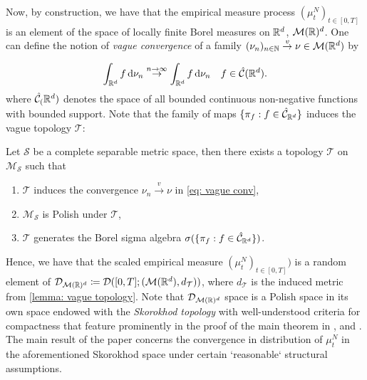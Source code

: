 \documentclass{article}
\begin{document}
Now, by construction, we have that the empirical measure process $ (\mu^{N}_{t})_{t\in [0,T]}$ is an element of the space of locally finite Borel measures on $ \mathbb{R}^{d}$, $ \mathcal{M}(\mathbb{R})^{d}$. One can define the notion of \textit{vague convergence} of a family $ (\nu_{n})_{n\in \mathbb{N}} \stackrel{v}{\to} \nu\in \mathcal{M}(\mathbb{R}^{d})$ by 

\begin{equation}\label{eq: vague conv}
	\int_{\mathbb{R}^{d}}f \operatorname{d}\! \nu_{n}\stackrel{n\to \infty}{\to} \int_{\mathbb{R}^{d}}f \operatorname{d}\! \nu_{n} \quad  f\in \hat{\mathcal{C}}(\mathbb{R}^{d}).
\end{equation}
where $ \hat{\mathcal{C}}_(\mathbb{R}^{d})$ denotes the space of all bounded continuous non-negative functions with bounded support. Note that the family of maps $\{\pi_{f}:f\in \hat {\mathcal{C}}_{\mathbb{R}^{d}}\} $ induces the vague topology $ \mathcal{T}$: 

\begin{boxlemma}\label{lemma: vague topology}
Let $  \mathcal{S}$ be a complete separable metric space, then there exists a topology $  \mathcal{T}$ on $  \mathcal{M}_{ \mathcal{ S}}$ such that
\begin{enumerate}
\item $ \mathcal{T}$ induces the convergence $ \nu_{n}\stackrel{v}{\longrightarrow}\nu$ in \ref{eq: vague conv},
\item $ \mathcal{M}_{ \mathcal{S}}$ is Polish under $  \mathcal{T}$,
\item $  \mathcal{T}$ generates the Borel sigma algebra $\sigma(\{\pi_{f}:f\in \hat {\mathcal{C}}_{\mathbb{R}^{d}}\})$.
\end{enumerate}

\end{boxlemma}

Hence, we have that the scaled empirical measure $ (\mu^{N}_{t})_{t\in [0,T]})$ is a random element of $ \mathcal{D}_{ \mathcal{M}(\mathbb{R})^{d}} \coloneqq \mathcal{D}([0,T]; ( \mathcal{M}(\mathbb{R}^{d}), d_\mathcal{T}))$, where $d_ \mathcal{T}$ is the induced metric from \ref{lemma: vague topology}. Note that $  \mathcal{D}_{ \mathcal{M}(\mathbb{R})^{d}}$ space is a Polish space in its own space endowed with the \textit{Skorokhod topology} with well-understood criteria for compactness that feature prominently in the proof of the main theorem in \cite{sirignano2019meanfieldanalysislln}, and \cite{sirignano2019meanfieldanalysisclt}.\\

The main result of the paper \cite{sirignano2019meanfieldanalysislln} concerns the convergence in distribution of $ \mu^{N}_{t}$ in the aforementioned Skorokhod space under certain `reasonable` structural assumptions.
\end{document}
